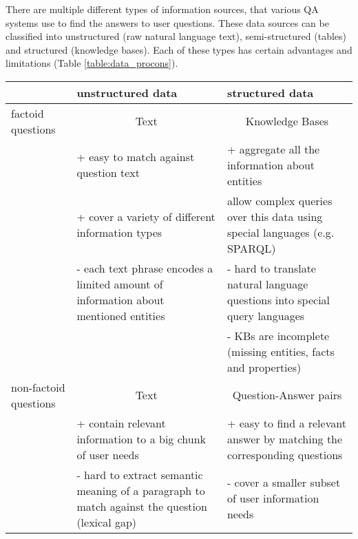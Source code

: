 There are multiple different types of information sources, that various QA systems use to find the answers to user questions.
These data sources can be classified into unstructured (\eg raw natural language text), semi-structured (\eg tables) and structured (\eg knowledge bases).
Each of these types has certain advantages and limitations (Table \ref{table:data_procons}).

\begin{table*}
\centering
\caption{Pros and cons of structured and unstructured data sources for factoid and non-factoid question answering}
\begin{tabular}{| l | p{6cm} | p{6cm} |}
\hline
 & unstructured data & structured data \\
\hline
factoid questions & \multicolumn{1}{|c|}{Text} & \multicolumn{1}{|c|}{Knowledge Bases} \\
 & + easy to match against question text & + aggregate all the information about entities\\
 & + cover a variety of different information types & allow complex queries over this data using special languages (e.g. SPARQL) \\
 & - each text phrase encodes a limited amount of information about mentioned entities & - hard to translate natural language questions into special query languages \\
&  & - KBs are incomplete (missing entities, facts and properties) \\
\hline
non-factoid questions & \multicolumn{1}{|c|}{Text} & \multicolumn{1}{|c|}{Question-Answer pairs} \\
 & + contain relevant information to a big chunk of user needs & + easy to find a relevant answer by matching the corresponding questions \\
 & - hard to extract semantic meaning of a paragraph to match against the question (lexical gap) & - cover a smaller subset of user information needs \\
\hline
\end{tabular}
\label{table:data_procons}
\end{table*}


